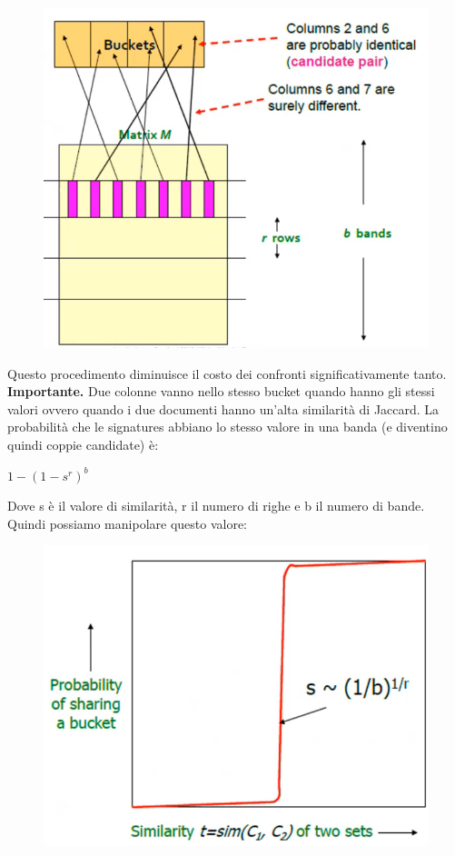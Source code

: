 \begin{figure}[th]
    \centering
    \includegraphics[scale=0.5]{FrequentItems/img/lsh.png}
\end{figure}
Questo procedimento diminuisce il costo dei confronti significativamente tanto. 
\\
\textbf{Importante.} Due colonne vanno nello stesso bucket quando hanno gli stessi valori ovvero quando i due documenti hanno un'alta similarità di Jaccard. La probabilità che le signatures abbiano lo stesso valore in una banda (e diventino quindi coppie candidate) è:
\begin{center}
    \begin{math}
        1 - (1 - s^r)^b
    \end{math}
\end{center}
Dove s è il valore di similarità, r il numero di righe e b il numero di bande. Quindi possiamo manipolare questo valore: 
\\
\begin{figure}[th]
    \centering
    \includegraphics[scale=0.5]{FrequentItems/img/graph.png}
\end{figure}
